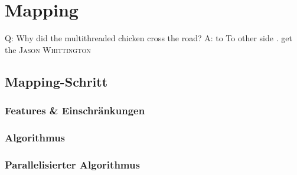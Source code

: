 
\chapter{Mapping} %

\label{Chapter6} %


\begin{itquote}
Q: Why did the multithreaded chicken cross the road?
A: to To other side . get the
\flushright
\textsc{Jason Whittington}
\end{itquote}

\section{Mapping-Schritt}

  \subsection{Features \& Einschränkungen}

  \subsection{Algorithmus}

  \subsection{Parallelisierter Algorithmus}
